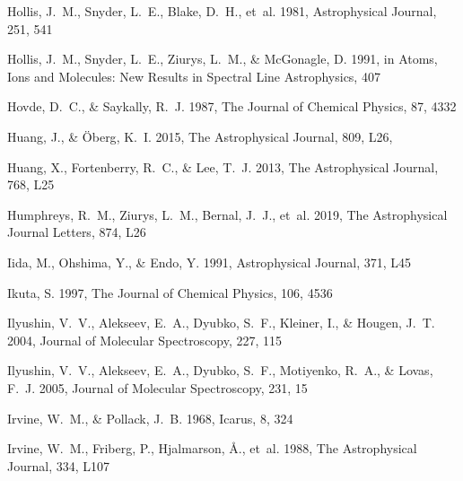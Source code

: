 \documentclass[twocolumn]{aastex631}
\begin{document}
\begin{thebibliography}{}
Hollis, J.~M., Snyder, L.~E., Blake, D.~H., {et~al.} 1981, Astrophysical
  Journal, 251, 541

Hollis, J.~M., Snyder, L.~E., Ziurys, L.~M., \& McGonagle, D. 1991, in Atoms,
  Ions and Molecules: New Results in Spectral Line Astrophysics, 407

Hovde, D.~C., \& Saykally, R.~J. 1987, The Journal of Chemical Physics, 87,
  4332

{Huang}, J., \& {{\"O}berg}, K.~I. 2015, The Astrophysical Journal, 809, L26,

Huang, X., Fortenberry, R.~C., \& Lee, T.~J. 2013, The Astrophysical Journal,
  768, L25

Humphreys, R.~M., Ziurys, L.~M., Bernal, J.~J., {et~al.} 2019, The
  Astrophysical Journal Letters, 874, L26

Iida, M., Ohshima, Y., \& Endo, Y. 1991, Astrophysical Journal, 371, L45

Ikuta, S. 1997, The Journal of Chemical Physics, 106, 4536

Ilyushin, V.~V., Alekseev, E.~A., Dyubko, S.~F., Kleiner, I., \& Hougen, J.~T.
  2004, Journal of Molecular Spectroscopy, 227, 115

Ilyushin, V.~V., Alekseev, E.~A., Dyubko, S.~F., Motiyenko, R.~A., \& Lovas,
  F.~J. 2005, Journal of Molecular Spectroscopy, 231, 15

Irvine, W.~M., \& Pollack, J.~B. 1968, Icarus, 8, 324

Irvine, W.~M., Friberg, P., Hjalmarson, {\AA}., {et~al.} 1988{},
  The Astrophysical Journal, 334, L107


\end{thebibliography}
\end{document}
